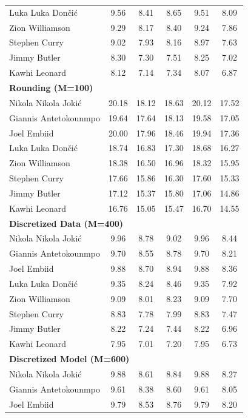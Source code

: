 \documentclass[11pt,a4paper]{article}
\begin{document}
\begin{table}[H]
\begin{tabular}{lccccc}
Luka Luka Don\v{c}i\'{c} & 9.56 & 8.41 & 8.65 & 9.51 & 8.09 \\
Zion Williamson & 9.29 & 8.17 & 8.40 & 9.24 & 7.86 \\
Stephen Curry & 9.02 & 7.93 & 8.16 & 8.97 & 7.63 \\
Jimmy Butler & 8.30 & 7.30 & 7.51 & 8.25 & 7.02 \\
Kawhi Leonard & 8.12 & 7.14 & 7.34 & 8.07 & 6.87 \\
\midrule
\multicolumn{6}{l}{\textbf{Rounding (M=100)}} \\
\midrule
Nikola Nikola Joki\'{c} & 20.18 & 18.12 & 18.63 & 20.12 & 17.52 \\
Giannis Antetokounmpo & 19.64 & 17.64 & 18.13 & 19.58 & 17.05 \\
Joel Embiid & 20.00 & 17.96 & 18.46 & 19.94 & 17.36 \\
Luka Luka Don\v{c}i\'{c} & 18.74 & 16.83 & 17.30 & 18.68 & 16.27 \\
Zion Williamson & 18.38 & 16.50 & 16.96 & 18.32 & 15.95 \\
Stephen Curry & 17.66 & 15.86 & 16.30 & 17.60 & 15.33 \\
Jimmy Butler & 17.12 & 15.37 & 15.80 & 17.06 & 14.86 \\
Kawhi Leonard & 16.76 & 15.05 & 15.47 & 16.70 & 14.55 \\
\midrule
\multicolumn{6}{l}{\textbf{Discretized Data (M=400)}} \\
\midrule
Nikola Nikola Joki\'{c} & 9.96 & 8.78 & 9.02 & 9.96 & 8.44 \\
Giannis Antetokounmpo & 9.70 & 8.55 & 8.78 & 9.70 & 8.21 \\
Joel Embiid & 9.88 & 8.70 & 8.94 & 9.88 & 8.36 \\
Luka Luka Don\v{c}i\'{c} & 9.35 & 8.24 & 8.46 & 9.35 & 7.92 \\
Zion Williamson & 9.09 & 8.01 & 8.23 & 9.09 & 7.70 \\
Stephen Curry & 8.83 & 7.78 & 7.99 & 8.83 & 7.47 \\
Jimmy Butler & 8.22 & 7.24 & 7.44 & 8.22 & 6.96 \\
Kawhi Leonard & 7.95 & 7.01 & 7.20 & 7.95 & 6.73 \\
\midrule
\multicolumn{6}{l}{\textbf{Discretized Model (M=600)}} \\
\midrule
Nikola Nikola Joki\'{c} & 9.88 & 8.61 & 8.84 & 9.88 & 8.27 \\
Giannis Antetokounmpo & 9.61 & 8.38 & 8.60 & 9.61 & 8.05 \\
Joel Embiid & 9.79 & 8.53 & 8.76 & 9.79 & 8.20 \\

\end{tabular}
\end{table}
\end{document}
